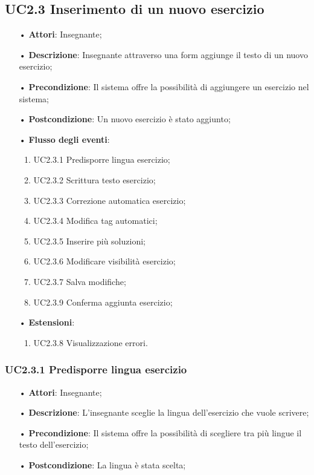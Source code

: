 \subsection{UC2.3 Inserimento di un nuovo esercizio}
\begin{itemize}
	\item[•] \textbf{Attori}: Insegnante;
	\item[•] \textbf{Descrizione}: Insegnante attraverso una form aggiunge il testo di un nuovo esercizio;
	\item[•] \textbf{Precondizione}: Il sistema offre la possibilità di aggiungere un esercizio nel sistema;
	\item[•] \textbf{Postcondizione}: Un nuovo esercizio è stato aggiunto;
	\item[•] \textbf{Flusso degli eventi}:
	\begin{enumerate}
		\item UC2.3.1 Predisporre lingua esercizio;
		\item UC2.3.2 Scrittura testo esercizio;
		\item UC2.3.3 Correzione automatica esercizio;
		\item UC2.3.4 Modifica tag automatici;
		\item UC2.3.5 Inserire più soluzioni;
		\item UC2.3.6 Modificare visibilità esercizio;
		\item UC2.3.7 Salva modifiche;
		\item UC2.3.9 Conferma aggiunta esercizio;
	\end{enumerate}
	\item[•] \textbf{Estensioni}:	
	\begin{enumerate}
		\item UC2.3.8 Visualizzazione errori.
	\end{enumerate}
\end{itemize}

\subsubsection{UC2.3.1 Predisporre lingua esercizio}
\begin{itemize}
	\item[•] \textbf{Attori}: Insegnante;
	\item[•] \textbf{Descrizione}: L'insegnante sceglie la lingua dell’esercizio che vuole scrivere;
	\item[•] \textbf{Precondizione}: Il sistema offre la possibilità di scegliere tra più lingue il testo 
			dell’esercizio;
	\item[•] \textbf{Postcondizione}: La lingua è stata scelta;
\end{itemize}


